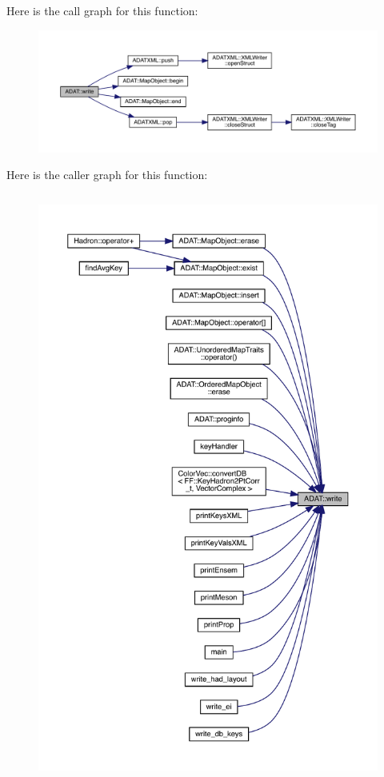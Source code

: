 Here is the call graph for this function\+:\nopagebreak
\begin{figure}[H]
\begin{center}
\leavevmode
\includegraphics[width=350pt]{d5/d0d/namespaceADAT_a38920c20e5e4ccb234f9a05e436a4faa_cgraph}
\end{center}
\end{figure}
Here is the caller graph for this function\+:\nopagebreak
\begin{figure}[H]
\begin{center}
\leavevmode
\includegraphics[height=550pt]{d5/d0d/namespaceADAT_a38920c20e5e4ccb234f9a05e436a4faa_icgraph}
\end{center}
\end{figure}
